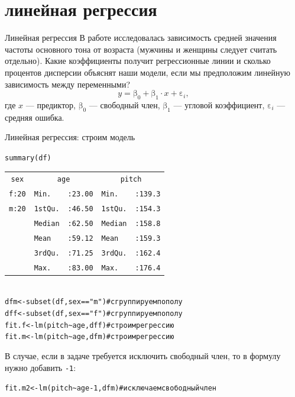 \section{линейная регрессия}
\begin{frame}{Линейная регрессия}
В работе исследовалась зависимость средней значения частоты основного тона от возраста (мужчины и женщины следует считать отдельно). Какие коэффициенты получит регрессионные линии и сколько процентов дисперсии объяснят наши модели, если мы предположим линейную зависимость между переменными?\pause
\vfill
$$y=\mbox{β}_0+\mbox{β}_1\cdot x+\mbox{ε}_i,$$
где $x$  — предиктор, $\mbox{β}_0$  — свободный член, $\mbox{β}_1$  — угловой коэффициент, $\mbox{ε}_i$  — средняя ошибка.
\vfill

\end{frame}
\begin{frame}{Линейная регрессия: строим модель}
\scriptsize
\begin{alltt}
\alert{summary(df)}\\
\begin{tabular}{lllll}
\multicolumn{1}{c}{sex} & \multicolumn{2}{c}{age} & \multicolumn{2}{c}{pitch} \\
f:20                    & Min.        & :23.00    & Min.         & :139.3     \\
m:20                    & 1st Qu.     & :46.50    & 1st Qu.      & :154.3     \\
                        & Median      & :62.50    & Median       & :158.8     \\
                        & Mean        & :59.12    & Mean         & :159.3     \\
                        & 3rd Qu.     & :71.25    & 3rd Qu.      & :162.4     \\
                        & Max.        & :83.00    & Max.         & :176.4    
\end{tabular}
\bigskip \\
dfm <- subset(df, sex=="m") \hfill \# сгруппируем по полу\\
dff <- subset(df, sex=="f")  \hfill \# сгруппируем по полу \bigskip \\
fit.f <- \alert{lm(pitch\textasciitilde age, dff)} \hfill \# cтроим регрессию\\
fit.m <- \alert{lm(pitch\textasciitilde age, dfm)} \hfill \# cтроим регрессию\\
\end{alltt}
\normalsize
\vfill
В случае, если в задаче требуется исключить свободный член, то в формулу нужно добавить \scriptsize\verb"-1"\normalsize:
\scriptsize
\begin{alltt}
fit.m2 <- \alert{lm(pitch\textasciitilde age - 1, dfm)} \hfill \# исключаем свободный член\\
\end{alltt}
\normalsize
\end{frame}
